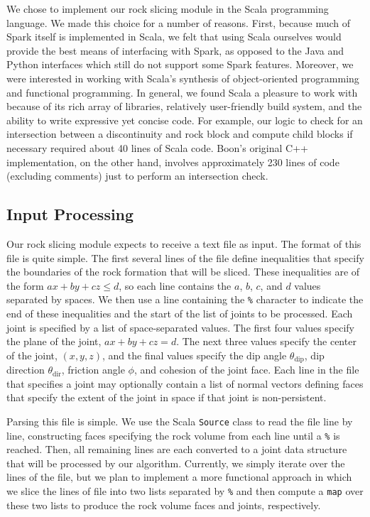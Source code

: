 We chose to implement our rock slicing module in the Scala programming language. We made this choice for a number of reasons. First, because much of Spark itself is implemented in Scala, we felt that using Scala ourselves would provide the best means of interfacing with Spark, as opposed to the Java and Python interfaces which still do not support some Spark features. Moreover, we were interested in working with Scala's synthesis of object-oriented programming and functional programming. In general, we found Scala a pleasure to work with because of its rich array of libraries, relatively user-friendly build system, and the ability to write expressive yet concise code. For example, our logic to check for an intersection between a discontinuity and rock block and compute child blocks if necessary required about 40 lines of Scala code. Boon's original C++ implementation, on the other hand, involves approximately 230 lines of code (excluding comments) just to perform an intersection check.

\subsection{Input Processing}
Our rock slicing module expects to receive a text file as input. The format of this file is quite simple. The first several lines of the file define inequalities that specify the boundaries of the rock formation that will be sliced. These inequalities are of the form $ax + by + cz \leq d$, so each line contains the $a$, $b$, $c$, and $d$ values separated by spaces. We then use a line containing the \texttt{\%} character to indicate the end of these inequalities and the start of the list of joints to be processed. Each joint is specified by a list of space-separated values. The first four values specify the plane of the joint, $ax + by + cz = d$. The next three values specify the center of the joint, $(x,y,z)$, and the final values specify the dip angle $\theta_{\text{dip}}$, dip direction $\theta_{\text{dir}}$, friction angle $\phi$, and cohesion of the joint face. Each line in the file that specifies a joint may optionally contain a list of normal vectors defining faces that specify the extent of the joint in space if that joint is non-persistent.

Parsing this file is simple. We use the Scala \texttt{Source} class to read the file line by line, constructing faces specifying the rock volume from each line until a \texttt{\%} is reached. Then, all remaining lines are each converted to a joint data structure that will be processed by our algorithm. Currently, we simply iterate over the lines of the file, but we plan to implement a more functional approach in which we slice the lines of file into two lists separated by \texttt{\%} and then compute a \texttt{map} over these two lists to produce the rock volume faces and joints, respectively.

